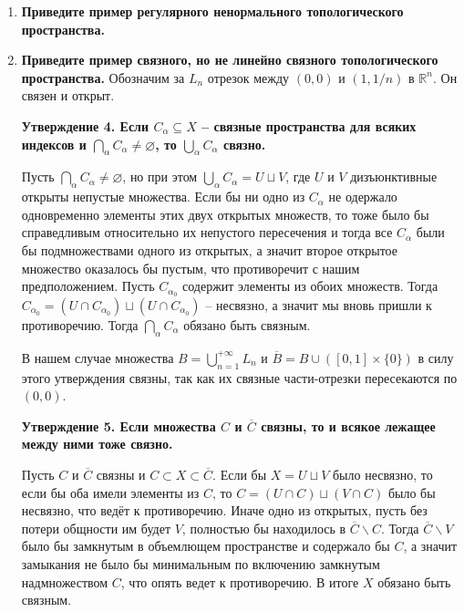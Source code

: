 \documentclass{article}
\begin{document}
\begin{enumerate}
    \item \textbf{Приведите пример регулярного ненормального топологического
        пространства.}

    \item \textbf{Приведите пример связного, но не линейно связного
        топологического пространства.}
    Обозначим за $L_n$ отрезок между $(0,0)$ и $(1,1/n)$ в $\mathbb{R}^n$. Он
    связен и открыт.\par

    \textbf{Утверждение 4. Если $C_\alpha\subseteq X$ – связные пространства
    для всяких индексов и $\bigcap_\alpha C_\alpha\neq\varnothing$, то
    $\bigcup_\alpha C_\alpha$ связно.}\par

    Пусть $\bigcap_\alpha C_\alpha\neq\varnothing$, но при этом $\bigcup_\alpha
    C_\alpha=U\sqcup V$, где $U$ и $V$ дизъюнктивные открыты непустые множества.
    Если бы ни одно из $C_\alpha$ не одержало одновременно элементы этих двух
    открытых множеств, то тоже было бы справедливым относительно их непустого
    пересечения и тогда все $C_\alpha$ были бы подмножествами одного из
    открытых, а значит второе открытое множество оказалось бы пустым, что
    противоречит с нашим предположением. Пусть $C_{\alpha_0}$ содержит элементы
    из обоих множеств. Тогда $C_{\alpha_0}=(U\cap C_{\alpha_0})\sqcup (U\cap C_
    {\alpha_0})$ – несвязно, а значит мы вновь пришли к противоречию. Тогда
    $\bigcap_\alpha C_\alpha$ обязано быть связным.

    В нашем случае множества $B=\bigcup_{n=1}^{+\infty}L_n$ и $\overline{B}=B
    \cup([0,1]\times\{0\})$ в силу этого утверждения связны, так как их связные
    части-отрезки пересекаются по $(0,0)$.

    \textbf{Утверждение 5. Если множества $C$ и $\overline{C}$ связны, то и
    всякое лежащее между ними тоже связно.}

    Пусть $C$ и $\overline{C}$ связны и $C\subset X\subset\overline{C}$. Если
    бы $X=U\sqcup V$ было несвязно, то если бы оба имели элементы из $C$, то
    $C=(U\cap C)\sqcup (V\cap C)$ было бы несвязно, что ведёт к противоречию.
    Иначе одно из открытых, пусть без потери общности им будет $V$, полностью
    бы находилось в $\overline{C}\backslash C$. Тогда $\overline{C}\backslash V$
    было бы замкнутым в объемлющем пространстве и содержало бы $C$, а значит
    замыкания не было бы минимальным по включению замкнутым надмножеством $C$,
    что опять ведет к противоречию. В итоге $X$ обязано быть связным.



\end{enumerate}
\end{document}
